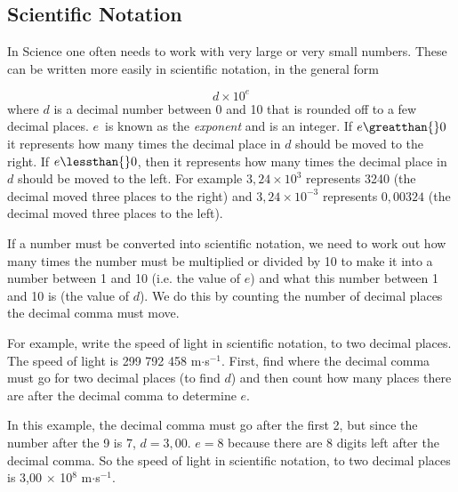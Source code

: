            \subsection*{Scientific Notation}
            \nopagebreak
        \label{m30853*id64607}In Science one often needs to work with very large or very small numbers. These can be written more easily in scientific notation, in the general form\par 
        \label{m30853*id64612}\nopagebreak\noindent{}
          
    \begin{equation}
    d\ensuremath{\times}{10}^{e}\tag{5}
      \end{equation}
        \label{m30853*id64634}where $d$ is a decimal number between 0 and 10 that is rounded off to a few decimal places. $e$~is known as the \textsl{exponent} and is an integer.
If $e\greatthan{}0$ it represents how many times the decimal place in $d$ should be moved to the right. If $e\lessthan{}0$, then it represents how many times the decimal place in $d$ should be moved to the left. For example $3,24\ensuremath{\times}{10}^{3}$ represents 3240 (the decimal moved three places to the right) and $3,24\ensuremath{\times}{10}^{-3}$ represents $0,00324$ (the decimal moved three places to the left).\par 
        \label{m30853*id64777}If a number must be converted into scientific notation, we need to work out how many times the number must be multiplied or divided by 10 to make it into a number between 1 and 10 (i.e. the value of $e$) and what this number between 1 and 10 is (the value of $d$). We do this by counting the number of decimal places the decimal comma must move.\par 
        \label{m30853*id64801}For example, write the speed of light in scientific notation, to two decimal places. The speed of light is 299 792 458 m$\ensuremath{\cdot}$s${}^{-1}$. First, find where the decimal comma must go for two decimal places (to find $d$) and then count how many places there are after the decimal comma to determine $e$.\par 
        \label{m30853*id64849}In this example, the decimal comma must go after the first 2, but since the number after the 9 is 7, $d=3,00$. $e=8$ because there are 8 digits left after the decimal comma. So the speed of light in scientific notation, to two decimal places is 3,00 $\ensuremath{\times}$ 10${}^{8}$ m$\ensuremath{\cdot}$s${}^{-1}$.\par 
      \label{m30853*uid19}

